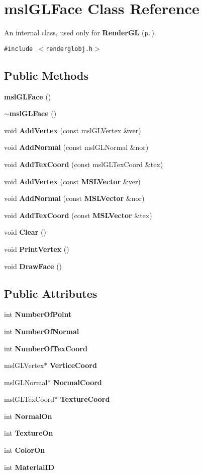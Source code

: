 \section{msl\-GLFace  Class Reference}
\label{classmslGLFace}
An internal class, used only for {\bf Render\-GL} {\rm (p.\,\pageref{classRenderGL})}. 


{\tt \#include $<$renderglobj.h$>$}

\subsection*{Public Methods}
\begin{CompactItemize}
\item 
{\bf msl\-GLFace} ()
\item 
{\bf $\sim$msl\-GLFace} ()
\item 
void {\bf Add\-Vertex} (const msl\-GLVertex \&ver)
\item 
void {\bf Add\-Normal} (const msl\-GLNormal \&nor)
\item 
void {\bf Add\-Tex\-Coord} (const msl\-GLTex\-Coord \&tex)
\item 
void {\bf Add\-Vertex} (const {\bf MSLVector} \&ver)
\item 
void {\bf Add\-Normal} (const {\bf MSLVector} \&nor)
\item 
void {\bf Add\-Tex\-Coord} (const {\bf MSLVector} \&tex)
\item 
void {\bf Clear} ()
\item 
void {\bf Print\-Vertex} ()
\item 
void {\bf Draw\-Face} ()
\end{CompactItemize}
\subsection*{Public Attributes}
\begin{CompactItemize}
\item 
int {\bf Number\-Of\-Point}
\item 
int {\bf Number\-Of\-Normal}
\item 
int {\bf Number\-Of\-Tex\-Coord}
\item 
msl\-GLVertex$\ast$ {\bf Vertice\-Coord}
\item 
msl\-GLNormal$\ast$ {\bf Normal\-Coord}
\item 
msl\-GLTex\-Coord$\ast$ {\bf Texture\-Coord}
\item 
int {\bf Normal\-On}
\item 
int {\bf Texture\-On}
\item 
int {\bf Color\-On}
\item 
int {\bf Material\-ID}
\end{CompactItemize}


